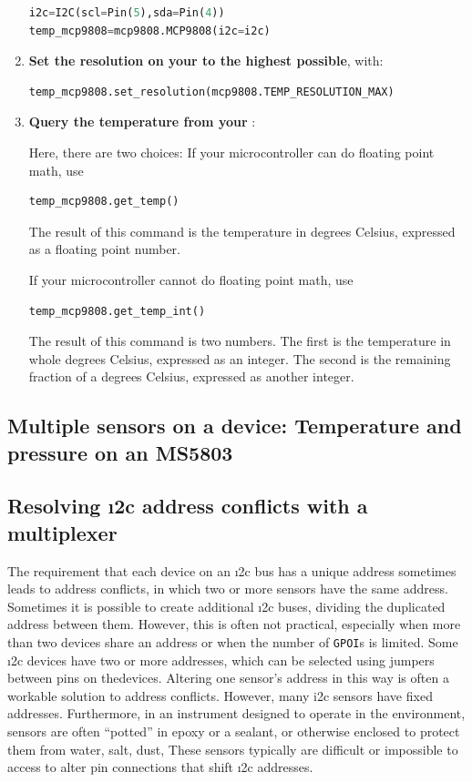 \begin{enumerate}
\begin{lstlisting}[language=Python]
i2c=I2C(scl=Pin(5),sda=Pin(4))
temp_mcp9808=mcp9808.MCP9808(i2c=i2c)
\end{lstlisting}
	\item \textbf{Set the resolution on your  to the highest possible}, with:
\begin{lstlisting}[language=Python]
temp_mcp9808.set_resolution(mcp9808.TEMP_RESOLUTION_MAX)
\end{lstlisting}

	\item \textbf{Query the temperature from your }:

	Here, there are two choices:
	If your microcontroller can do floating point math, use
\begin{lstlisting}[language=Python]
temp_mcp9808.get_temp()
\end{lstlisting}
The result of this command is the temperature in degrees Celsius, expressed as a floating point number.

\smallskip
If your microcontroller cannot do floating point math, use
\begin{lstlisting}[language=Python]
temp_mcp9808.get_temp_int()
\end{lstlisting}
The result of this command is two numbers.
The first is the temperature in whole degrees Celsius, expressed as an integer.
The second is the remaining fraction of a degrees Celsius, expressed as another integer.

\end{enumerate}


\subsection{\color{gray} Multiple sensors on a device: Temperature and pressure on an MS5803 \color{black}}

\subsection{\color{gray} Resolving \i2c address conflicts with a multiplexer \color{black}}
The requirement that each device on an \i2c bus has a unique address sometimes leads to address conflicts, in which two or more sensors have the same address.
Sometimes it is possible to create additional \i2c buses, dividing the duplicated address between them.
However, this is often not practical, especially when more than two devices share an address or when the number of \texttt{GPOI}s is limited.
Some \i2c devices have two or more addresses, which can be selected using jumpers between pins on thedevices.
Altering one sensor's address in this way is often a workable solution to address conflicts.
However, many i2c sensors have fixed addresses.
Furthermore, in an instrument designed to operate in the environment, sensors are often ``potted'' in epoxy or a sealant, or otherwise enclosed to protect them from water, salt, dust, \etc
These sensors typically are difficult or impossible to access to alter pin connections that shift \i2c addresses.

